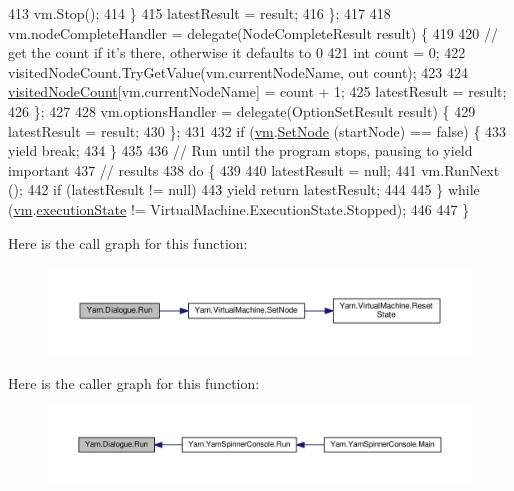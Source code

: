 \begin{DoxyCode}
413                     vm.Stop();
414                 \}
415                 latestResult = result;
416             \};
417 
418             vm.nodeCompleteHandler = delegate(NodeCompleteResult result) \{
419 
420                 \textcolor{comment}{// get the count if it's there, otherwise it defaults to 0}
421                 \textcolor{keywordtype}{int} count = 0;
422                 visitedNodeCount.TryGetValue(vm.currentNodeName, out count);
423 
424                 \hyperlink{a00092_aae9e64354066a1e2fa130629959d772b}{visitedNodeCount}[vm.currentNodeName] = count + 1;
425                 latestResult = result;
426             \};
427 
428             vm.optionsHandler = delegate(OptionSetResult result) \{
429                 latestResult = result;
430             \};
431 
432             \textcolor{keywordflow}{if} (\hyperlink{a00092_a8c1319357a9df6cff051328fb33224c7}{vm}.\hyperlink{a00162_a6364593ea1115d65e34b343422cfbbbd}{SetNode} (startNode) == \textcolor{keyword}{false}) \{
433                 yield \textcolor{keywordflow}{break};
434             \}
435 
436             \textcolor{comment}{// Run until the program stops, pausing to yield important}
437             \textcolor{comment}{// results}
438             \textcolor{keywordflow}{do} \{
439 
440                 latestResult = null;
441                 vm.RunNext ();
442                 \textcolor{keywordflow}{if} (latestResult != null)
443                     yield \textcolor{keywordflow}{return} latestResult;
444 
445             \} \textcolor{keywordflow}{while} (\hyperlink{a00092_a8c1319357a9df6cff051328fb33224c7}{vm}.\hyperlink{a00162_a66491da06023dabfb63d09e6ccbba74f}{executionState} != VirtualMachine.ExecutionState.Stopped);
446 
447         \}
\end{DoxyCode}


Here is the call graph for this function\-:
\nopagebreak
\begin{figure}[H]
\begin{center}
\leavevmode
\includegraphics[width=350pt]{a00092_aead84ee50cb113ca45724894290ce9c2_cgraph}
\end{center}
\end{figure}




Here is the caller graph for this function\-:
\nopagebreak
\begin{figure}[H]
\begin{center}
\leavevmode
\includegraphics[width=350pt]{a00092_aead84ee50cb113ca45724894290ce9c2_icgraph}
\end{center}
\end{figure}


